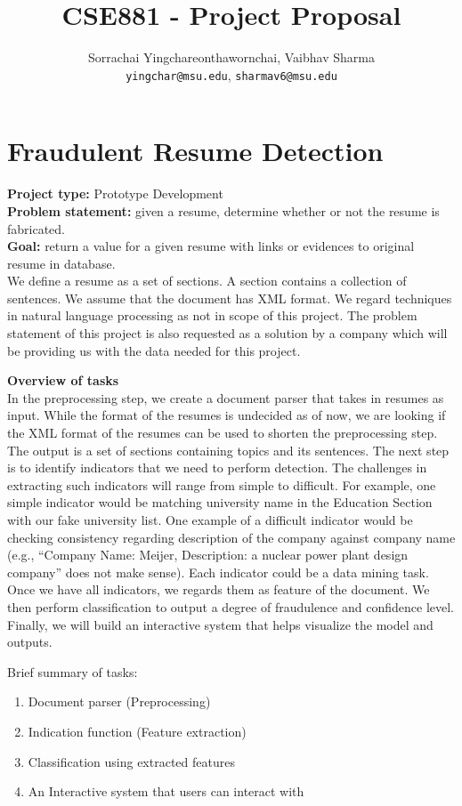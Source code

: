 \documentclass{article}
\title{CSE881 - Project Proposal}
\author{Sorrachai Yingchareonthawornchai, Vaibhav Sharma \\
 \texttt{yingchar@msu.edu}, \texttt{sharmav6@msu.edu}\\
}
\begin{document}
\maketitle
\section{Fraudulent Resume Detection}
\textbf{Project type:} Prototype Development
\\
\textbf{Problem statement:} given a resume, determine whether or not the resume
is fabricated. \\
\textbf{Goal:} return a value for a given resume with links or evidences to
original resume in database. \\
We define a resume as a set of sections. A section contains a collection of
sentences. We assume that the document has XML format. We regard
techniques in natural language processing as not in scope of this
project. The problem statement of this project is also requested as a solution by a company which will be providing us with the data needed for this project.

\textbf{Overview of tasks}\\
In the preprocessing step, we create a document parser that takes in
resumes as input. While the format of the resumes is undecided as of now, we are looking if the XML format of the resumes can be used to shorten the preprocessing step. The output is a set of sections containing
topics and its sentences.  The next step is to identify indicators
that we need to perform detection. The challenges in extracting such indicators will range from simple to difficult. For example, one simple indicator would be matching
university name in the Education Section with our fake university list. One example of a difficult indicator would be checking consistency
regarding description of the company against company name (e.g.,
``Company Name: Meijer, Description: a nuclear power plant design company'' does not make
sense). Each indicator could be a data mining task. Once we have
all indicators, we regards them as feature of the document. We then
perform classification to output a degree of fraudulence and
confidence level. Finally, we will build an interactive system that
helps visualize the model and outputs. 

Brief summary of tasks: 
\begin{enumerate}
\item Document parser (Preprocessing)
\item Indication function (Feature extraction)
\item Classification using extracted features
\item An Interactive system that users can interact with
\end{enumerate}
\end{document}
